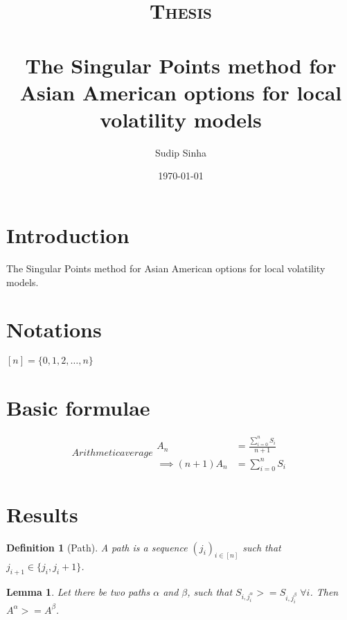 \documentclass[a4paper]{article}
\title{	
\normalfont \normalsize 
\textsc{Thesis} \\ [25pt]
\horrule{0.5pt} \\[0.4cm] %
\huge The Singular Points method for Asian American options for local volatility models %
\horrule{2pt} \\[0.5cm] %
}
\author{Sudip Sinha}
\date{\normalsize\today}
\numberwithin{equation}{section} %
\numberwithin{figure}{section} %
\numberwithin{table}{section} %
\newtheorem{lem}{Lemma}
\newtheorem{defn}{Definition}
\begin{document}
\maketitle	%




\section{Introduction}
The Singular Points method for Asian American options for local volatility models.


\section{Notations}
$[n] = \{0, 1, 2, \dots, n\}$


\section{Basic formulae}

\begin{subequations} \label{eq:arithmeticmean}
Arithmetic average
\begin{align}
A_{n} &= \frac{\sum_{i=0}^n S_i}{n+1} \\
\implies (n+1) A_{n} &= \sum_{i=0}^n S_i
\end{align}
\end{subequations}


\section{Results}

\begin{defn}[Path]
A path is a sequence $(j_i)_{i \in [n]}$ such that $j_{i+1} \in \{ j_i,j_i+1 \}$.
\end{defn}


\begin{lem}
Let there be two paths $\alpha$ and $\beta$, such that $S_{i,j_i^\alpha} >= S_{i,j_i^\beta} \; \forall i$. Then $A^\alpha >= A^\beta$.
\end{lem}
\end{document}
